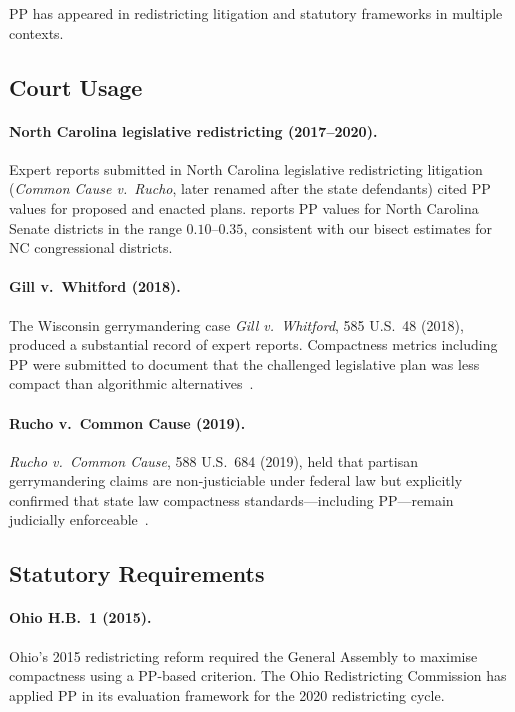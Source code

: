 PP has appeared in redistricting litigation and statutory frameworks in multiple
contexts.

\subsection{Court Usage}

\paragraph{North Carolina legislative redistricting (2017--2020).}
Expert reports submitted in North Carolina legislative redistricting litigation
(\textit{Common Cause v.\ Rucho}, later renamed after the state defendants)
cited PP values for proposed and enacted plans.
\citet{chen2017expert} reports PP values for North Carolina Senate districts
in the range $0.10$--$0.35$, consistent with our bisect estimates for NC
congressional districts.

\paragraph{Gill v.\ Whitford (2018).}
The Wisconsin gerrymandering case \textit{Gill v.\ Whitford}, 585 U.S.\ 48 (2018),
produced a substantial record of expert reports.
Compactness metrics including PP were submitted to document that the challenged
legislative plan was less compact than algorithmic alternatives~\citep{gill2018}.

\paragraph{Rucho v.\ Common Cause (2019).}
\textit{Rucho v.\ Common Cause}, 588 U.S.\ 684 (2019), held that partisan
gerrymandering claims are non-justiciable under federal law but explicitly
confirmed that state law compactness standards---including PP---remain
judicially enforceable~\citep{rucho2019}.

\subsection{Statutory Requirements}

\paragraph{Ohio H.B.\ 1 (2015).}
Ohio's 2015 redistricting reform required the General Assembly to maximise
compactness using a PP-based criterion.
The Ohio Redistricting Commission has applied PP in its evaluation framework
for the 2020 redistricting cycle.

